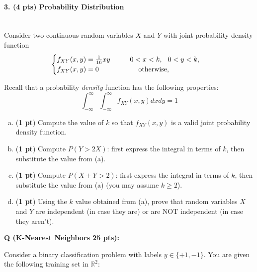 \documentclass{article}
\newcounter{questionno}
\newcounter{partno}
\newcommand{\question}[1]{
\noindent
\newline
\stepcounter{questionno}
\setcounter{partno}{0}
{\bf \large Q\arabic{questionno} (#1 pts): }
}
\begin{document}
\newpage

\paragraph{3. ({\bf 4 pts}) Probability Distribution }~\\

Consider two continuous random variables $X$ and $Y$ with joint probability density function
\begin{align*}
\begin{cases}
  f_{XY}(x,y) = \frac{1}{16}xy \hspace{1cm} 0 < x < k, \hspace{0.25cm} 0 < y < k, \\
  f_{XY}(x,y) = 0 \hspace{2cm} \text{otherwise,}
\end{cases}
\end{align*}

Recall that a probability {\em density} function has the following properties:\\
\[\int_{-\infty}^{\infty} \int_{-\infty}^{\infty} f_{XY}(x,y) dx dy = 1\]

\begin{enumerate}[(a)]
\item ({\bf 1 pt}) Compute the value of $k$ so that $f_{XY}(x,y)$ is a valid joint probability density function.
\item ({\bf 1 pt}) Compute $P(Y > 2X)$: first express the integral in terms of $k$, then substitute the value from (a).
\item ({\bf 1 pt}) Compute $P(X + Y > 2)$: first express the integral in terms of $k$, then substitute the value from (a) (you may assume $k \geq 2$).
\item ({\bf 1 pt}) Using the $k$ value obtained from (a), prove that random variables $X$ and $Y$ are independent (in case they are) or are NOT independent (in case they aren't).
\end{enumerate}

\begin{tcolorbox}[breakable,enhanced,notitle,width=16.6cm,height=16cm]

\end{tcolorbox}

\question{K-Nearest Neighbors 25}

Consider a binary classification problem with labels \(y \in \{+1, -1\}\).
You are given the following training set in \(\mathbb{R}^2\):
\end{document}
